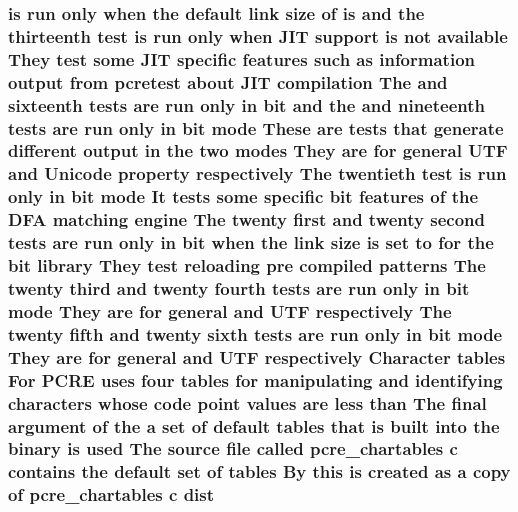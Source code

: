 \subsubsection[{\texorpdfstring{dist}{dist}}]{ {\bf is} {\bf run} only when the {\bf default} link {\bf size} {\bf of} {\bf is} and the thirteenth test {\bf is} {\bf run} only when J\+IT {\bf support} {\bf is} {\bf not} {\bf available} They test some J\+IT specific {\bf features} such {\bf as} information {\bf output} {\bf from} {\bf pcretest} about J\+IT {\bf compilation} The and sixteenth {\bf tests} {\bf are} {\bf run} only {\bf in} {\bf bit} and the and nineteenth {\bf tests} {\bf are} {\bf run} only {\bf in} {\bf bit} {\bf mode} These {\bf are} {\bf tests} that generate different {\bf output} {\bf in} the two {\bf modes} They {\bf are} for general U\+TF and {\bf Unicode} property {\bf respectively} The twentieth test {\bf is} {\bf run} only {\bf in} {\bf bit} {\bf mode} It {\bf tests} some specific {\bf bit} {\bf features} {\bf of} the D\+FA {\bf matching} engine The twenty {\bf first} and twenty {\bf second} {\bf tests} {\bf are} {\bf run} only {\bf in} {\bf bit} when the link {\bf size} {\bf is} {\bf set} {\bf to} for the {\bf bit} {\bf library} They test reloading pre {\bf compiled} {\bf patterns} The twenty third and twenty fourth {\bf tests} {\bf are} {\bf run} only {\bf in} {\bf bit} {\bf mode} They {\bf are} for general and U\+TF {\bf respectively} The twenty fifth and twenty sixth {\bf tests} {\bf are} {\bf run} only {\bf in} {\bf bit} {\bf mode} They {\bf are} for general and U\+TF {\bf respectively} Character {\bf tables} For {\bf P\+C\+RE} uses four {\bf tables} for manipulating and identifying {\bf characters} whose {\bf code} {\bf point} {\bf values} {\bf are} less {\bf than} The final {\bf argument} {\bf of} the {\bf a} {\bf set} {\bf of} {\bf default} {\bf tables} that {\bf is} {\bf built} into the binary {\bf is} {\bf used} The {\bf source} {\bf file} called pcre\+\_\+chartables {\bf c} {\bf contains} the {\bf default} {\bf set} {\bf of} {\bf tables} By {\bf this} {\bf is} created {\bf as} {\bf a} copy {\bf of} pcre\+\_\+chartables {\bf c} dist}\hypertarget{README_8txt_aaa00612a17576703fa649e7c2a7da281}{}\label{README_8txt_aaa00612a17576703fa649e7c2a7da281}
